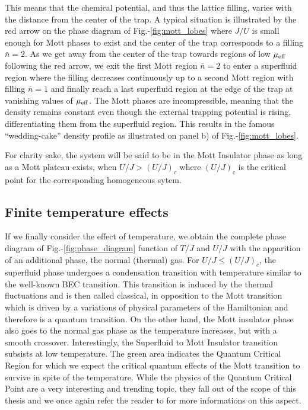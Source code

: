 \noindent This means that the chemical potential, and thus the lattice filling, varies with the distance from the center of the trap. A typical situation is illustrated by the red arrow on the phase diagram of Fig.-\ref{fig:mott_lobes} where $J/U$ is small enough for Mott phases to exist and the center of the trap corresponds to a filling $\bar{n}=2$. As we get away from the center of the trap towards regions of low $\mu_{\rm{eff}}$ following the red arrow, we exit the first Mott region $\bar{n}=2$ to enter a superfluid region where the filling decreases continuously up to a second Mott region with filling $\bar{n}=1$ and finally reach a last superfluid region at the edge of the trap at vanishing values of $\mu_{\rm{eff}}$. The Mott phases are incompressible, meaning that the density remains constant even though the external trapping potential is rising, differentiating them from the superfluid region. This results in the famous ``wedding-cake'' density profile as illustrated on panel b) of Fig.-\ref{fig:mott_lobes}.

\noindent For clarity sake, the system will be said to be in the Mott Insulator phase as long as a Mott plateau exists, \ie when $U/J > (U/J)_c$ where $(U/J)_c$ is the critical point for the corresponding homogeneous sytem.

\subsection{Finite temperature effects}

If we finally consider the effect of temperature, we obtain the complete phase diagram of Fig.-\ref{fig:phase_diagram} function of $T/J$ and $U/J$ with the apparition of an additional phase, the normal (thermal) gas. For $U/J \leq (U/J)_c$, the superfluid phase undergoes a condensation transition with temperature similar to the well-known BEC transition. This transition is induced by the thermal fluctuations and is then called classical, in opposition to the Mott transition which is driven by a variations of physical parameters of the Hamiltonian and therefore is a quantum transition. On the other hand, the Mott insulator phase also goes to the normal gas phase as the temperature increases, but with a smooth crossover. Interestingly, the Superfluid to Mott Insulator transition subsists at low temperature. The green area indicates the Quantum Critical Region for which we expect the critical quantum effects of the Mott transition to survive in spite of the temperature. While the physics of the Quantum Critical Point are a very interesting and trending topic, they fall out of the scope of this thesis and we once again refer the reader to \cite{carcy_these} for more informations on this aspect.


